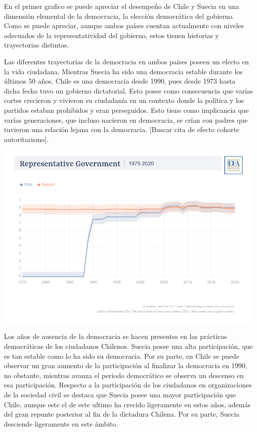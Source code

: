 \documentclass[12pt,twoside]{templates/facsothesis}
\begin{document}
En el primer grafico se puede apreciar el desempeño de Chile y Suecia en una dimensión elemental de la democracia, la elección democrática del gobierno. Como se puede apreciar, aunque ambos países cuentan actualmente con niveles adecuados de la representatividad del gobierno, estos tienen historias y trayectorias distintas.

Las diferentes trayectorias de la democracia en ambos países poseen un efecto en la vida ciudadana. Mientras Suecia ha sido una democracia estable durante los últimos 50 años, Chile es una democracia desde 1990, pues desde 1973 hasta dicha fecha tuvo un gobierno dictatorial. Esto posee como consecuencia que varías cortes crecieron y vivieron su ciudadanía en un contexto donde la política y los partidos estaban prohibidos y eran perseguidos. Esto tiene como implicancia que varías generaciones, que incluso nacieron en democracia, se crían con padres que tuvieron una relación lejana con la democracia. {[}Buscar cita de efecto cohorte autoritarismo{]}.

\includegraphics{input/images/representative-government_1975-2020.png}

Los años de ausencia de la democracia se hacen presentes en las prácticas democráticas de los ciudadanos Chilenos. Suecia posee una alta participación, que es tan estable como lo ha sido su democracia. Por su parte, en Chile se puede observar un gran aumento de la participación al finalizar la democracia en 1990, no obstante, mientras avanza el periodo democrático se observa un descenso en esa participación. Respecto a la participación de los ciudadanos en organizaciones de la sociedad civil se destaca que Suecia posee una mayor participación que Chile, aunque este el de este ultimo ha crecido ligeramente en estos años, además del gran repunte posterior al fin de la dictadura Chilena. Por su parte, Suecia desciende ligeramente en este ámbito.
\end{document}
